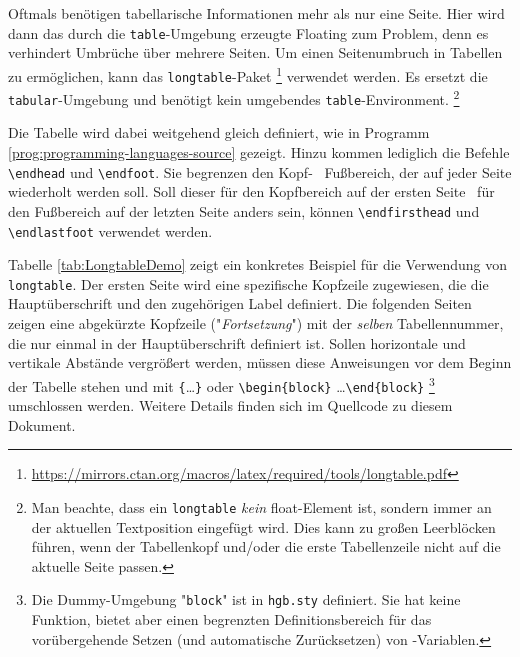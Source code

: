 Oftmals benötigen tabellarische Informationen mehr als nur eine Seite. Hier
wird dann das durch die \texttt{table}-Umgebung erzeugte Floating zum
Problem, denn es verhindert Umbrüche über mehrere Seiten. Um einen
Seitenumbruch in Tabellen zu ermöglichen, kann das \texttt{longtable}-Paket%
\footnote{%
\url{https://mirrors.ctan.org/macros/latex/required/tools/longtable.pdf}}
verwendet werden. Es ersetzt die \texttt{tabular}-Umgebung und benötigt kein
umgebendes \texttt{table}-Environment.%
\footnote{Man beachte, dass ein \texttt{longtable} \emph{kein} float-Element 
ist, sondern immer an der aktuellen Textposition eingefügt wird. Dies kann 
zu großen Leerblöcken führen, wenn der Tabellenkopf und/oder die erste
Tabellenzeile nicht auf die aktuelle Seite passen.}

Die Tabelle wird dabei weitgehend gleich definiert, wie in Programm
\ref{prog:programming-languages-source} gezeigt. Hinzu kommen lediglich die
Befehle \verb|\endhead| und \verb|\endfoot|. Sie begrenzen den Kopf- \bzw\
Fußbereich, der auf jeder Seite wiederholt werden soll. Soll dieser für den
Kopfbereich auf der ersten Seite \bzw\ für den Fußbereich auf der letzten
Seite anders sein, können \verb|\endfirsthead| und \verb|\endlastfoot|
verwendet werden.


Tabelle \ref{tab:LongtableDemo} zeigt ein konkretes Beispiel für die Verwendung
von \texttt{longtable}. Der ersten Seite wird eine spezifische Kopfzeile 
zugewiesen, die die Hauptüberschrift und den zugehörigen Label definiert. 
Die folgenden Seiten zeigen eine abgekürzte Kopfzeile ("\emph{Fortsetzung}")
mit der \emph{selben} Tabellennummer, die nur einmal in der Hauptüberschrift
definiert ist. Sollen horizontale und vertikale Abstände vergrößert werden,
müssen diese Anweisungen vor dem Beginn der Tabelle stehen und mit 
\verb|{|\ldots\verb|}| oder \verb|\begin{block}| \ldots \verb|\end{block}|%
\footnote{Die Dummy-Umgebung "\texttt{block}" ist in \texttt{hgb.sty} 
definiert. Sie hat keine Funktion, bietet aber einen begrenzten 
Definitionsbereich für das vorübergehende Setzen (und automatische Zurücksetzen)
von \latex-Variablen.}
umschlossen werden. Weitere Details finden sich im Quellcode zu diesem Dokument.


